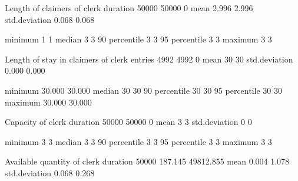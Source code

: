 \documentclass[letterpaper,10pt,english]{sphinxmanual}
\begin{document}
\begin{sphinxVerbatim}[commandchars=\\\{\}]
Length of claimers of clerk                  duration          50000        50000            0
                                             mean                  2.996        2.996
                                             std.deviation         0.068        0.068

                                             minimum               1            1
                                             median                3            3
                                             90\PYGZpc{} percentile        3            3
                                             95\PYGZpc{} percentile        3            3
                                             maximum               3            3

Length of stay in claimers of clerk          entries            4992         4992            0
                                             mean                 30           30
                                             std.deviation         0.000        0.000

                                             minimum              30.000       30.000
                                             median               30           30
                                             90\PYGZpc{} percentile       30           30
                                             95\PYGZpc{} percentile       30           30
                                             maximum              30.000       30.000

Capacity of clerk                            duration          50000        50000            0
                                             mean                  3            3
                                             std.deviation         0            0

                                             minimum               3            3
                                             median                3            3
                                             90\PYGZpc{} percentile        3            3
                                             95\PYGZpc{} percentile        3            3
                                             maximum               3            3

Available quantity of clerk                  duration          50000          187.145    49812.855
                                             mean                  0.004        1.078
                                             std.deviation         0.068        0.268


\end{sphinxVerbatim}
\end{document}
